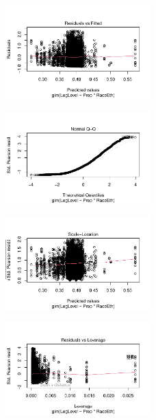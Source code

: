 \documentclass[
  letterpaper,
  DIV=11,
  numbers=noendperiod]{scrartcl}
\begin{document}
\begin{figure}[H]

{\centering \includegraphics[width=0.5\textwidth,height=\textheight]{appendix_files/figure-pdf/unnamed-chunk-4-1.pdf}

}

\end{figure}

\begin{figure}[H]

{\centering \includegraphics[width=0.5\textwidth,height=\textheight]{appendix_files/figure-pdf/unnamed-chunk-4-2.pdf}

}

\end{figure}

\begin{figure}[H]

{\centering \includegraphics[width=0.5\textwidth,height=\textheight]{appendix_files/figure-pdf/unnamed-chunk-4-3.pdf}

}

\end{figure}

\begin{figure}[H]

{\centering \includegraphics[width=0.5\textwidth,height=\textheight]{appendix_files/figure-pdf/unnamed-chunk-4-4.pdf}

}

\end{figure}
\end{document}

